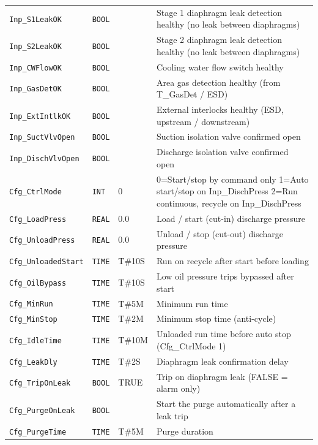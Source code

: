 \begin{small}
\begin{longtable}{@{}P{3.70cm}P{2.20cm}P{1.70cm}P{8.91cm}@{}}
\texttt{Inp\_S1LeakOK} & \texttt{BOOL} &  & Stage 1 diaphragm leak detection healthy (no leak between diaphragms) \\
\texttt{Inp\_S2LeakOK} & \texttt{BOOL} &  & Stage 2 diaphragm leak detection healthy (no leak between diaphragms) \\
\texttt{Inp\_CWFlowOK} & \texttt{BOOL} &  & Cooling water flow switch healthy \\
\texttt{Inp\_GasDetOK} & \texttt{BOOL} &  & Area gas detection healthy (from T\_GasDet /\allowbreak{} ESD) \\
\texttt{Inp\_ExtIntlkOK} & \texttt{BOOL} &  & External interlocks healthy (ESD, upstream /\allowbreak{} downstream) \\
\texttt{Inp\_SuctVlvOpen} & \texttt{BOOL} &  & Suction isolation valve confirmed open \\
\texttt{Inp\_DischVlvOpen} & \texttt{BOOL} &  & Discharge isolation valve confirmed open \\
\texttt{Cfg\_CtrlMode} & \texttt{INT} & 0 & 0=Start/\allowbreak{}stop by command only 1=Auto start/\allowbreak{}stop on Inp\_DischPress 2=Run continuous, recycle on Inp\_DischPress \\
\texttt{Cfg\_LoadPress} & \texttt{REAL} & 0.0 & Load /\allowbreak{} start (cut-in) discharge pressure \\
\texttt{Cfg\_UnloadPress} & \texttt{REAL} & 0.0 & Unload /\allowbreak{} stop (cut-out) discharge pressure \\
\texttt{Cfg\_UnloadedStart} & \texttt{TIME} & T\#10S & Run on recycle after start before loading \\
\texttt{Cfg\_OilBypass} & \texttt{TIME} & T\#10S & Low oil pressure trips bypassed after start \\
\texttt{Cfg\_MinRun} & \texttt{TIME} & T\#5M & Minimum run time \\
\texttt{Cfg\_MinStop} & \texttt{TIME} & T\#2M & Minimum stop time (anti-cycle) \\
\texttt{Cfg\_IdleTime} & \texttt{TIME} & T\#10M & Unloaded run time before auto stop (Cfg\_CtrlMode 1) \\
\texttt{Cfg\_LeakDly} & \texttt{TIME} & T\#2S & Diaphragm leak confirmation delay \\
\texttt{Cfg\_TripOnLeak} & \texttt{BOOL} & TRUE & Trip on diaphragm leak (FALSE = alarm only) \\
\texttt{Cfg\_PurgeOnLeak} & \texttt{BOOL} &  & Start the purge automatically after a leak trip \\
\texttt{Cfg\_PurgeTime} & \texttt{TIME} & T\#5M & Purge duration \\

\end{longtable}
\end{small}
